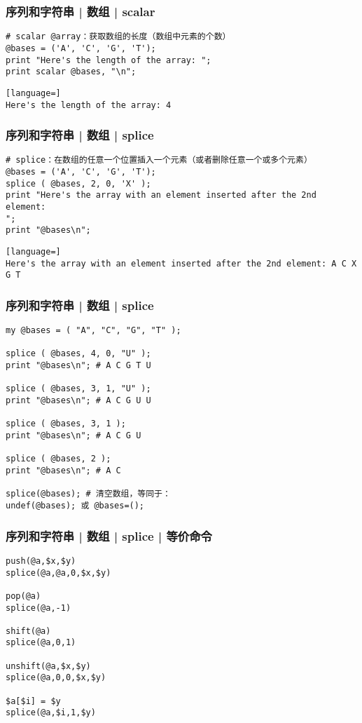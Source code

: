 \begin{frame}[fragile]
  \frametitle{序列和字符串 | 数组 | \alert{scalar}}
\begin{lstlisting}
# scalar @array：获取数组的长度（数组中元素的个数）
@bases = ('A', 'C', 'G', 'T');
print "Here's the length of the array: ";
print scalar @bases, "\n";
\end{lstlisting}
\pause
\begin{lstlisting}[language=]
Here's the length of the array: 4
\end{lstlisting}
\end{frame}

\begin{frame}[fragile]
  \frametitle{序列和字符串 | 数组 | \alert{splice}}
\begin{lstlisting}
# splice：在数组的任意一个位置插入一个元素（或者删除任意一个或多个元素）
@bases = ('A', 'C', 'G', 'T');
splice ( @bases, 2, 0, 'X' );
print "Here's the array with an element inserted after the 2nd element:
";
print "@bases\n";
\end{lstlisting}
\pause
\begin{lstlisting}[language=]
Here's the array with an element inserted after the 2nd element: A C X G T
\end{lstlisting}
\end{frame}

\begin{frame}[fragile]
  \frametitle{序列和字符串 | 数组 | splice}
  \vspace{-0.5em}
\begin{lstlisting}
my @bases = ( "A", "C", "G", "T" );

splice ( @bases, 4, 0, "U" );
print "@bases\n"; # A C G T U

splice ( @bases, 3, 1, "U" );
print "@bases\n"; # A C G U U

splice ( @bases, 3, 1 );
print "@bases\n"; # A C G U

splice ( @bases, 2 );
print "@bases\n"; # A C

splice(@bases); # 清空数组，等同于：
undef(@bases); 或 @bases=();
\end{lstlisting}
\end{frame}

\begin{frame}[fragile]
  \frametitle{序列和字符串 | 数组 | splice | 等价命令}
\begin{lstlisting}
push(@a,$x,$y)
splice(@a,@a,0,$x,$y)

pop(@a)
splice(@a,-1)

shift(@a)
splice(@a,0,1)

unshift(@a,$x,$y)
splice(@a,0,0,$x,$y)

$a[$i] = $y
splice(@a,$i,1,$y)
\end{lstlisting}
\end{frame}

